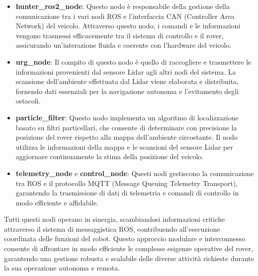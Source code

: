 \begin{itemize}
  \item \textbf{hunter\_ros2\_node}: Questo nodo è responsabile della gestione della comunicazione tra i vari nodi ROS e l'interfaccia CAN (Controller Area Network) del veicolo. Attraverso questo nodo, i comandi e le informazioni vengono trasmessi efficacemente tra il sistema di controllo e il rover, assicurando un'interazione fluida e coerente con l'hardware del veicolo.

  \item \textbf{urg\_node}: Il compito di questo nodo è quello di raccogliere e trasmettere le informazioni provenienti dal sensore Lidar agli altri nodi del sistema. La scansione dell'ambiente effettuata dal Lidar viene elaborata e distribuita, fornendo dati essenziali per la navigazione autonoma e l'evitamento degli ostacoli.

  \item \textbf{particle\_filter}: Questo nodo implementa un algoritmo di localizzazione basato su filtri particellari, che consente di determinare con precisione la posizione del rover rispetto alla mappa dell'ambiente circostante. Il nodo utilizza le informazioni della mappa e le scansioni del sensore Lidar per aggiornare continuamente la stima della posizione del veicolo.

  \item \textbf{telemetry\_node} e \textbf{control\_node}: Questi nodi gestiscono la comunicazione tra ROS e il protocollo MQTT (Message Queuing Telemetry Transport), garantendo la trasmissione di dati di telemetria e comandi di controllo in modo efficiente e affidabile.
\end{itemize}

\noindent Tutti questi nodi operano in sinergia, scambiandosi informazioni critiche attraverso il sistema di messaggistica ROS, contribuendo all'esecuzione coordinata delle funzioni del robot. Questo approccio modulare e interconnesso consente di affrontare in modo efficiente le complesse esigenze operative del rover, garantendo una gestione robusta e scalabile delle diverse attività richieste durante la sua operazione autonoma e remota.
